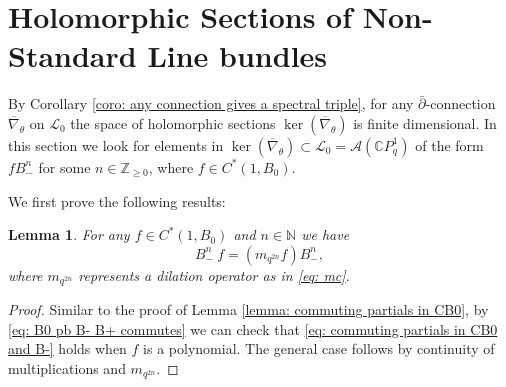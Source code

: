 \documentclass[12pt]{article}
\newtheorem{lemma}[definition]{Lemma}
\numberwithin{equation}{section}
\def\pb{\bar{\partial}}
\def\nb{\bar{\nabla}_\theta}
\def\nb{\overline{\nabla}_\theta}
\def\Z{{\mathbb Z}}
\def\N{{\mathbb N}}
\def\C{{\mathbb C}}
\def\A{\mathcal{A}}
\def\L{\mathcal{L}}
\begin{document}
\section{Holomorphic Sections of Non-Standard Line bundles}\label{section: holomorphic sections}

By Corollary \ref{coro: any connection gives a spectral triple}, for any $\pb$-connection $\nb$ on $\L_0$ the space of holomorphic sections
$
\ker (\nb)
$ is finite dimensional. In this section we look for elements in $\ker(\overline{\nabla}_\theta)\subset \L_0=\A(\C P^1_q)$ of the form $fB_-^n $ for some $n \in \Z_{\geq 0}$,  where $f\in C^*(1, B_0)$.

We first prove the following results:

\begin{lemma}\label{lemma: commuting partials in CB0 and B-}
For any $f\in C^*(1,B_0)$ and $n\in \N$ we have
\begin{equation}\label{eq: commuting partials in CB0 and B-}
 B_-^n ~f=(m_{q^{2n}}f)B_-^n,
\end{equation}
where $m_{q^{2n}}$ represents a dilation operator as in \eqref{eq: mc}.
\end{lemma}
\begin{proof}
    Similar to the proof of Lemma \ref{lemma: commuting partials in CB0}, by  \eqref{eq: B0 pb B- B+ commutes}  we can check that \eqref{eq: commuting partials in CB0 and B-} holds when $f$ is a polynomial. The general case follows by  continuity of multiplications and $m_{q^{2n}}$.
\end{proof}
\end{document}
